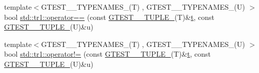 \begin{DoxyCompactItemize}
\item 
{\footnotesize template$<$G\+T\+E\+S\+T\+\_\+\_\+\+T\+Y\+P\+E\+N\+A\+M\+E\+S\+\_\+(\+T) , G\+T\+E\+S\+T\+\_\+\_\+\+T\+Y\+P\+E\+N\+A\+M\+E\+S\+\_\+(\+U) $>$ }\\bool \mbox{\hyperlink{namespacestd_1_1tr1_af4516de784404381f9b14797694b6311}{std\+::tr1\+::operator==}} (const \mbox{\hyperlink{gtest-tuple_8h_a275e7bcd84299cc44b9c1dba971951c4}{G\+T\+E\+S\+T\+\_\+\_\+\+T\+U\+P\+L\+E\+\_\+}}(T)\&\mbox{\hyperlink{_mutual_8h_a978d88b393c8a37dc2614c88788b3442}{t}}, const \mbox{\hyperlink{gtest-tuple_8h_a275e7bcd84299cc44b9c1dba971951c4}{G\+T\+E\+S\+T\+\_\+\_\+\+T\+U\+P\+L\+E\+\_\+}}(U)\&u)
\item 
{\footnotesize template$<$G\+T\+E\+S\+T\+\_\+\_\+\+T\+Y\+P\+E\+N\+A\+M\+E\+S\+\_\+(\+T) , G\+T\+E\+S\+T\+\_\+\_\+\+T\+Y\+P\+E\+N\+A\+M\+E\+S\+\_\+(\+U) $>$ }\\bool \mbox{\hyperlink{namespacestd_1_1tr1_a058882c51de469b5e78d29076f864940}{std\+::tr1\+::operator!=}} (const \mbox{\hyperlink{gtest-tuple_8h_a275e7bcd84299cc44b9c1dba971951c4}{G\+T\+E\+S\+T\+\_\+\_\+\+T\+U\+P\+L\+E\+\_\+}}(T)\&\mbox{\hyperlink{_mutual_8h_a978d88b393c8a37dc2614c88788b3442}{t}}, const \mbox{\hyperlink{gtest-tuple_8h_a275e7bcd84299cc44b9c1dba971951c4}{G\+T\+E\+S\+T\+\_\+\_\+\+T\+U\+P\+L\+E\+\_\+}}(U)\&u)
\end{DoxyCompactItemize}
